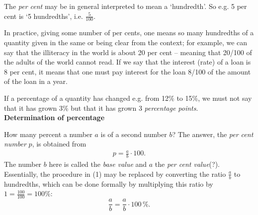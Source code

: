 \documentclass[12pt]{article}
\theoremstyle{definition}
\begin{document}

The  {\em per cent} may be in general interpreted to mean a `hundredth'.  So e.g. 5 per cent is `5 hundredths', i.e. $\frac{5}{100}$.

In practice, giving some number of per cents, one means so many hundredths of a quantity given in the same  or being clear from the context; for example, we can say that the illiteracy in the world is about 20 per cent -- meaning that 20/100 of the adults of the world cannot read.  If we say that the interest (rate) of a loan is 8 per cent, it means that one must pay interest for the loan 8/100 of the amount of the loan in a year.

If a percentage of a quantity has changed e.g. from 12\% to 15\%, we must not say that it has grown 3\% but that it has grown 3 {\em percentage points}.\\

\textbf{Determination of percentage}

How many percent a number $a$ is of a second number $b$?  The answer, the {\em per cent number} $p$, is obtained from
\begin{align}
p = \frac{a}{b}\cdot 100.
\end{align}
The number $b$ here is called the {\em base value} and $a$ the {\em per cent value}(?).  Essentially, the procedure in (1) may be replaced by converting the ratio $\frac{a}{b}$ to hundredths, which can be done formally by multiplying this ratio by\, $1 = \frac{100}{100} = 100\%$:
$$\frac{a}{b} = \frac{a}{b}\cdot 100\,\%.$$



\end{document}
